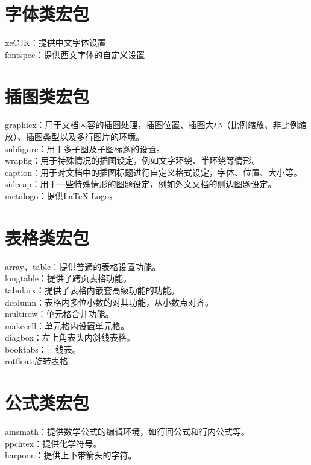 \documentclass[12pt]{book}
\begin{document}
\section{字体类宏包}

\noindent xeCJK：提供中文字体设置 \\
fontspec：提供西文字体的自定义设置

\section{插图类宏包}

\noindent graphicx：用于文档内容的插图处理，插图位置、插图大小（比例缩放、非比例缩放）、插图类型以及多行图片的环境。\\
subfigure：用于多子图及子图标题的设置。\\
wrapfig：用于特殊情况的插图设定，例如文字环绕、半环绕等情形。\\
caption：用于对文档中的插图标题进行自定义格式设定，字体、位置、大小等。\\
sidecap：用于一些特殊情形的图题设定，例如外文文档的侧边图题设定。 \\
metalogo：提供\LaTeX{} Logo。

\section{表格类宏包}


\noindent array、table：提供普通的表格设置功能。\\
longtable：提供了跨页表格功能。\\
tabularx：提供了表格内嵌套高级功能的功能。\\
dcolumn：表格内多位小数的对其功能，从小数点对齐。\\
multirow：单元格合并功能。\\
makecell：单元格内设置单元格。\\
diagbox：左上角表头内斜线表格。\\
booktabs：三线表。 \\
rotfloat:旋转表格

\section{公式类宏包}


\noindent amsmath：提供数学公式的编辑环境，如行间公式和行内公式等。\\
ppchtex：提供化学符号。\\
harpoon：提供上下带箭头的字符。
\end{document}
